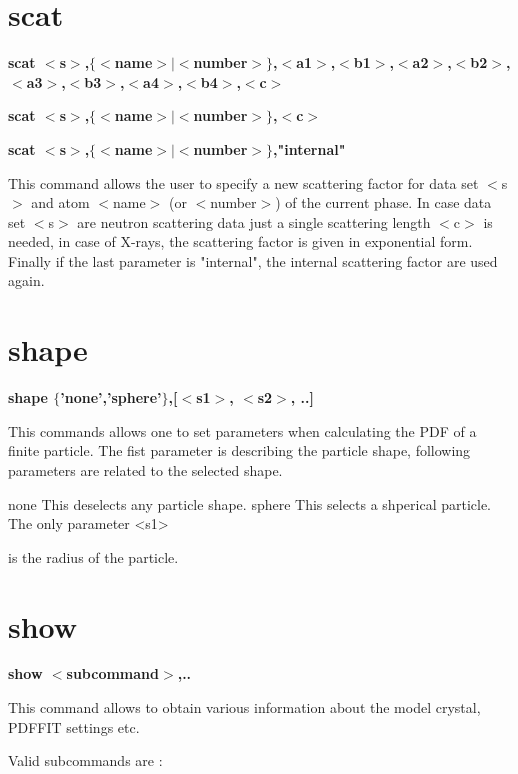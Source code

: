 \section{scat}
{\bf scat $ <$s$> $,$ \{$$ <$name$> $$| $$ <$number$> $$\} $,$ <$a1$> $,$ <$b1$> $,$ <$a2$> $,$ <$b2$> $,$ <$a3$> $,$ <$b3$> $,$ <$a4$> $,$ <$b4$> $,$ <$c$> $ \par }
{\bf scat $ <$s$> $,$ \{$$ <$name$> $$| $$ <$number$> $$\} $,$ <$c$> $ \par }
{\bf scat $ <$s$> $,$ \{$$ <$name$> $$| $$ <$number$> $$\} $,"internal" \par }
\par
\vspace{3pt}
This command allows the user to specify a new scattering factor 
for data set $ <$s$> $ and atom $ <$name$> $ (or $ <$number$> $) of the current 
phase. In case data set $ <$s$> $ are neutron scattering data just a 
single scattering length $ <$c$> $ is needed, in case of X-rays, the 
scattering factor is given in exponential form. Finally if the 
last parameter is "internal", the internal scattering factor 
are used again. 
\section{shape}
{\bf shape $ \{$'none','sphere'$\} $,[$ <$s1$> $, $ <$s2$> $, ..] \par }
\par
\vspace{3pt}
 This commands allows one to set parameters when calculating the 
 PDF of a finite particle. The fist parameter is describing the 
 particle shape, following parameters are related to the selected 
 shape. 
\par
\begin{MacVerbatim}
 none     This deselects any particle shape.
 sphere   This selects a shperical particle. The only parameter <s1>
\end{MacVerbatim}
          is the radius of the particle. 
\section{show}
{\bf show $ <$subcommand$> $,.. \par }
\par
\vspace{3pt}
This command allows to obtain various information about the 
model crystal, PDFFIT settings etc. 
\par
Valid subcommands are : 
\par
